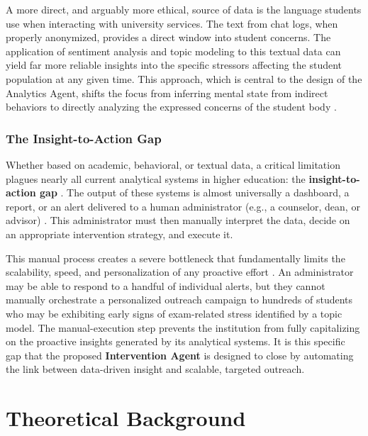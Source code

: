 A more direct, and arguably more ethical, source of data is the language students use when interacting with university services. The text from chat logs, when properly anonymized, provides a direct window into student concerns. The application of sentiment analysis and topic modeling to this textual data can yield far more reliable insights into the specific stressors affecting the student population at any given time. This approach, which is central to the design of the Analytics Agent, shifts the focus from inferring mental state from indirect behaviors to directly analyzing the expressed concerns of the student body \cite{paolucci2024wellbeinganalytics}.

\subsubsection{The Insight-to-Action Gap}
Whether based on academic, behavioral, or textual data, a critical limitation plagues nearly all current analytical systems in higher education: the \textbf{insight-to-action gap} \cite{jorno2018actionableinsight}. The output of these systems is almost universally a dashboard, a report, or an alert delivered to a human administrator (e.g., a counselor, dean, or advisor) \cite{susnjak2022dashboard}. This administrator must then manually interpret the data, decide on an appropriate intervention strategy, and execute it.

This manual process creates a severe bottleneck that fundamentally limits the scalability, speed, and personalization of any proactive effort \cite{kaliisa2023hypedashboards}. An administrator may be able to respond to a handful of individual alerts, but they cannot manually orchestrate a personalized outreach campaign to hundreds of students who may be exhibiting early signs of exam-related stress identified by a topic model. The manual-execution step prevents the institution from fully capitalizing on the proactive insights generated by its analytical systems. It is this specific gap that the proposed \textbf{Intervention Agent} is designed to close by automating the link between data-driven insight and scalable, targeted outreach.


\section{Theoretical Background}
\label{sec:theoretical_background}

